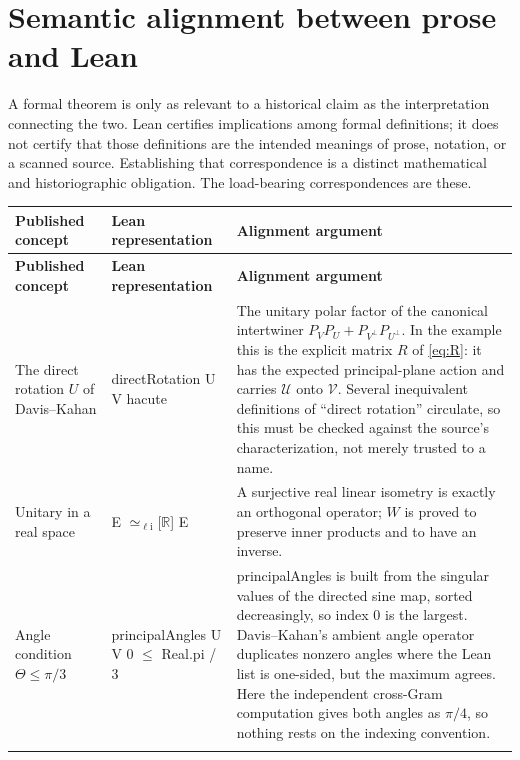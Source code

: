\documentclass[11pt]{article}
\theoremstyle{definition}
\newcommand{\lisoSym}{\ensuremath{\simeq_{\ell\mathrm{i}}}}
\newcommand{\code}[1]{{\ttfamily\color{kwcode}#1}}
\begin{document}
\section{Semantic alignment between prose and Lean}
\label{sec:alignment}

A formal theorem is only as relevant to a historical claim as the interpretation
connecting the two.  Lean certifies implications among formal definitions; it
does not certify that those definitions are the intended meanings of prose,
notation, or a scanned source.  Establishing that correspondence is a distinct
mathematical and historiographic obligation.  The load-bearing correspondences
are these.

\begin{longtable}{>{\raggedright\arraybackslash\strut}p{}
                  >{\raggedright\arraybackslash\strut\small}p{}
                  >{\raggedright\arraybackslash\strut}p{}}
\toprule
\textbf{Published concept} & \textbf{Lean representation} & \textbf{Alignment argument}\\
\midrule
\endfirsthead
\toprule
\textbf{Published concept} & \textbf{Lean representation} & \textbf{Alignment argument}\\
\midrule
\endhead
The direct rotation $U$ of Davis--Kahan
& \code{directRotation U V hacute}
& The unitary polar factor of the canonical intertwiner $P_VP_U+P_{V^\perp}P_{U^\perp}$.  In the example this is the explicit matrix $R$ of \cref{eq:R}: it has the expected principal-plane action and carries $\mathcal U$ onto $\mathcal V$.  Several inequivalent definitions of ``direct rotation'' circulate, so this must be checked against the source's characterization, not merely trusted to a name.\\
\addlinespace
Unitary in a real space
& \code{E \lisoSym[$\mathbb{R}$] E}
& A surjective real linear isometry is exactly an orthogonal operator; $W$ is proved to preserve inner products and to have an inverse.\\
\addlinespace
Angle condition $\Theta\leq\pi/3$
& \code{principalAngles U V 0 $\leq$ Real.pi / 3}
& \code{principalAngles} is built from the singular values of the directed sine map, sorted decreasingly, so index $0$ is the largest.  Davis--Kahan's ambient angle operator duplicates nonzero angles where the Lean list is one-sided, but the maximum agrees.  Here the independent cross-Gram computation gives both angles as $\pi/4$, so nothing rests on the indexing convention.\\
\addlinespace

\end{longtable}
\end{document}
